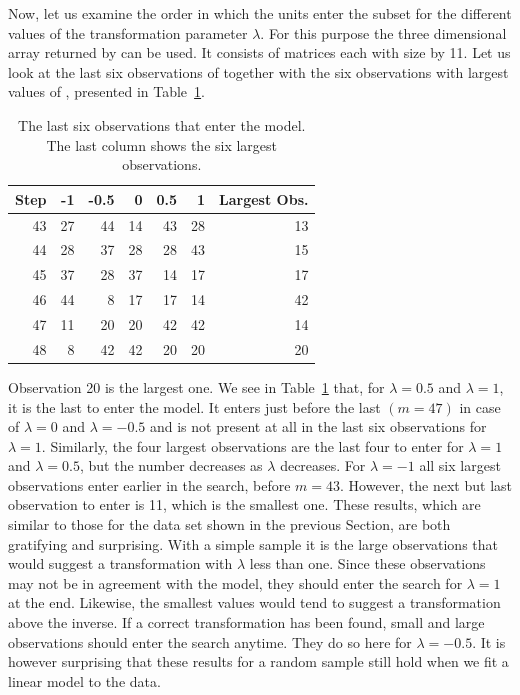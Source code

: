 \documentclass[article,shortnames,nojss]{jss}
\begin{document}
Now, let us examine the order in which the units enter the subset for the different values of the transformation parameter $\lambda$. For this purpose the three dimensional array  returned by  can be used. It consists of  matrices each with size  by 11. Let us look at the last six observations of  together with the six observations with largest values of , presented in Table~\ref{tab:ex-1}.


\begin{table}[ht]
\centering
\begin{tabular}{rrrrrrr}
  \hline
Step & -1 & -0.5 & 0 & 0.5 & 1 & Largest Obs. \\
  \hline
43 & 27 & 44 & 14 & 43 & 28 & 13 \\
  44 & 28 & 37 & 28 & 28 & 43 & 15 \\
  45 & 37 & 28 & 37 & 14 & 17 & 17 \\
  46 & 44 & 8 & 17 & 17 & 14 & 42 \\
  47 & 11 & 20 & 20 & 42 & 42 & 14 \\
  48 & 8 & 42 & 42 & 20 & 20 & 20 \\
   \hline
\end{tabular}
\caption{The last six observations that enter the model. The last column shows the six largest observations.}
\label{tab:ex-1}
\end{table}

Observation 20 is the largest one. We see in Table~\ref{tab:ex-1} that, for $\lambda=0.5$  and $\lambda=1$, it is the last to enter the model. It enters just before the last $(m = 47)$ in case of $\lambda=0$ and $\lambda=-0.5$ and is not present at all in the last six observations for $\lambda=1$. Similarly, the four largest observations are the last four to enter for $\lambda=1$ and $\lambda=0.5$, but the number decreases as $\lambda$ decreases. For $\lambda=-1$ all six largest observations enter earlier in the search, before $m=43$. However, the next but last observation to enter is 11, which is the smallest one. These results, which are similar to those for the  data set shown in the previous Section, are both gratifying and surprising. With a simple sample it is the large observations that would suggest a transformation with $\lambda$ less than one. Since these observations may not be in agreement with the model, they should enter the search for $\lambda=1$ at the end. Likewise, the smallest values would tend to suggest a transformation above the inverse. If a correct transformation has been found, small and large observations should enter the search anytime. They do so here for $\lambda=-0.5$. It is however surprising that these results for a random sample still hold when we fit a linear model to the data.
\end{document}
